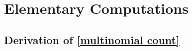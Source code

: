 \documentclass[twoside,11pt]{article}
\begin{document}
\section{Elementary Computations}

\subsection{Derivation of \eqref{multinomial count}}\label{app:comb}
\end{document}
